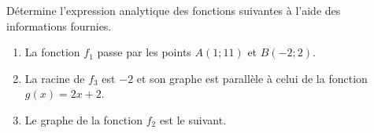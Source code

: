 %
%
    Détermine l'expression analytique des fonctions suivantes à l'aide des informations fournies.
    \begin{enumerate}
        \item La fonction $f_1$ passe par les points $A(1;11)$ et $B(-2;2)$.

        \item La racine de $f_3$ est $-2$ et son graphe est parallèle à celui de la fonction $g(x) = 2x + 2$.
        \item Le graphe de la fonction $f_2$ est le suivant. \hfil
    \end{enumerate}
